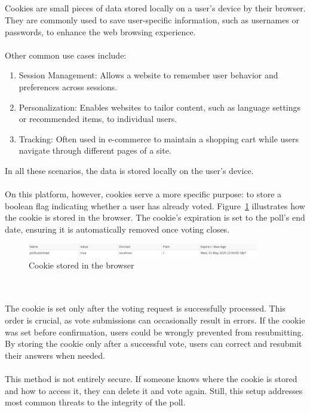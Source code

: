 \documentclass[a4paper,12pt]{report}
\begin{document}
\\ \\ \\ \\
Cookies are small pieces of data stored locally on a user’s device by their browser. They are commonly used to save user-specific information, such as usernames or passwords, to enhance the web browsing experience. \\ \\
 Other common use cases include:
\begin{enumerate} \item Session Management: Allows a website to remember user behavior and preferences across sessions. \item Personalization: Enables websites to tailor content, such as language settings or recommended items, to individual users. \item Tracking: Often used in e-commerce to maintain a shopping cart while users navigate through different pages of a site. \end{enumerate}
In all these scenarios, the data is stored locally on the user's device. \parencite{cookies} \\ \\
On this platform, however, cookies serve a more specific purpose: to store a boolean flag indicating whether a user has already voted. Figure~\ref{fig:cookie} illustrates how the cookie is stored in the browser. The cookie’s expiration is set to the poll’s end date, ensuring it is automatically removed once voting closes.
\begin{figure}[h!] 
	\centering 
	\includegraphics[width=0.9\textwidth]{pics/cookie.png} 
	\caption{Cookie stored in the browser} 
	\label{fig:cookie} 
\end{figure}\\ \\
The cookie is set only after the voting request is successfully processed. This order is crucial, as vote submissions can occasionally result in errors. If the cookie was set before confirmation, users could be wrongly prevented from resubmitting. By storing the cookie only after a successful vote, users can correct and resubmit their answers when needed.\\ \\
This method is not entirely secure. If someone knows where the cookie is stored and how to access it, they can delete it and vote again. Still, this setup addresses most common threats to the integrity of the poll. \\ \\
\end{document}
